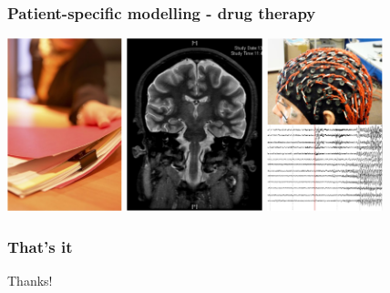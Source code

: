 \documentclass[compress]{beamer}
\begin{document}
\begin{frame}\frametitle{Patient-specific modelling - drug therapy}
	\includegraphics[height=5cm]{./Figures/PatientHistory.pdf}
	\includegraphics[height=5cm]{./Figures/PatientMRI.pdf}
	\includegraphics[height=5cm]{./Figures/PatientEEG.pdf}
\end{frame}
\begin{frame}\frametitle{That's it}
\begin{center}
	\large{Thanks!}
\end{center}
\end{frame}
\end{document}
